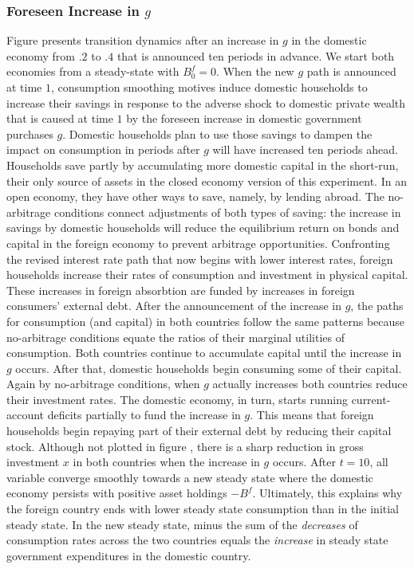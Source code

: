 \subsubsection{Foreseen Increase in $g$}

Figure  presents  transition dynamics after an increase in $g$   in the
domestic economy from $.2$ to $.4$ that is announced ten periods in advance. We start both economies
 from a steady-state with $B_{0}^f = 0$. When the new $g$ path  is
announced at time $1$, consumption smoothing motives induce domestic households to increase
their savings in response to the  adverse shock to domestic private
wealth that is caused at time $1$ by the foreseen increase
in domestic government purchases $g$.  Domestic households plan to  use those savings to  dampen the impact on
consumption in periods after $g$ will have increased ten periods ahead. Households  save partly by accumulating more
domestic capital in the short-run, their only source of assets in the closed economy version of this experiment.
 In an open economy, they have other ways to save, namely,  by lending abroad.
 The no-arbitrage conditions connect adjustments of both types of saving: the   increase
   in
savings  by domestic households will reduce the equilibrium return
on bonds and capital in the foreign economy to prevent arbitrage
opportunities. Confronting  the revised  interest rate path that now begins with lower
interest rates, foreign households increase their rates of consumption and
investment in physical capital. These increases in foreign absorbtion are funded
by  increases in foreign consumers' external debt. After the announcement of
the increase in $g$, the paths for consumption (and capital) in both countries follow
the same patterns because no-arbitrage conditions equate the ratios of their marginal utilities of consumption.
 Both countries continue to accumulate capital until the
increase in $g$ occurs. After that,  domestic households begin consuming some of their
 capital. Again by no-arbitrage conditions,  when  $g$  actually  increases both countries reduce their
investment rates. The domestic economy, in turn, starts
running current-account deficits partially to fund the increase in $g$. This
means that foreign households begin repaying part of their external debt by
reducing their  capital stock. Although not plotted in  figure , there is
a sharp reduction in gross investment $x$ in both countries when the increase in $g$ occurs. After
$t=10$, all variable converge smoothly towards a new steady state where the
domestic economy persists with positive asset holdings $- B^f$. Ultimately, this
explains why the foreign country ends with lower steady state consumption
than in  the initial steady state.  In the new steady state, minus the sum of the {\it decreases\/} of
consumption rates across the two countries equals the {\it increase} in steady state government expenditures
in the domestic country.

